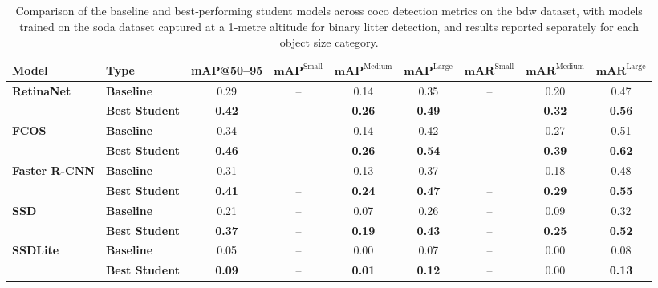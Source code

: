 \begin{table}[htbp]
\centering
\renewcommand{\arraystretch}{1.5} %
\begin{adjustbox}{width=\textwidth}
\begin{tabular}{llccccccc}
\hline
\textbf{Model} & \textbf{Type} & \textbf{mAP@50--95} & \(\mathbf{mAP}^{\text{Small}}\) & \(\mathbf{mAP}^{\text{Medium}}\) & \(\mathbf{mAP}^{\text{Large}}\) & \(\mathbf{mAR}^{\text{Small}}\) & \(\mathbf{mAR}^{\text{Medium}}\) & \(\mathbf{mAR}^{\text{Large}}\) \\ \hline
\multirow{2}{*}{\textbf{RetinaNet}} 
 & \textbf{Baseline}      & 0.29 & --    & 0.14 & 0.35 & --    & 0.20 & 0.47 \\
 & \textbf{Best Student}  & \textbf{0.42} & --    & \textbf{0.26} & \textbf{0.49} & --    & \textbf{0.32} & \textbf{0.56} \\ \hline
\multirow{2}{*}{\textbf{FCOS}} 
 & \textbf{Baseline}      & 0.34 & --    & 0.14 & 0.42 & --    & 0.27 & 0.51 \\
 & \textbf{Best Student}  & \textbf{0.46} & --    & \textbf{0.26} & \textbf{0.54} & --    & \textbf{0.39} & \textbf{0.62} \\ \hline
\multirow{2}{*}{\textbf{Faster R-CNN}} 
 & \textbf{Baseline}      & 0.31 & --    & 0.13 & 0.37 & --    & 0.18 & 0.48 \\
 & \textbf{Best Student}  & \textbf{0.41} & --    & \textbf{0.24} & \textbf{0.47} & --    & \textbf{0.29} & \textbf{0.55} \\ \hline
\multirow{2}{*}{\textbf{SSD}} 
 & \textbf{Baseline}      & 0.21 & --    & 0.07 & 0.26 & --    & 0.09 & 0.32 \\
 & \textbf{Best Student}  & \textbf{0.37} & --    & \textbf{0.19} & \textbf{0.43} & --    & \textbf{0.25} & \textbf{0.52} \\ \hline
\multirow{2}{*}{\textbf{SSDLite}} 
 & \textbf{Baseline}      & 0.05 & --    & 0.00 & 0.07 & --    & 0.00 & 0.08 \\
 & \textbf{Best Student}  & \textbf{0.09} & --    & \textbf{0.01} & \textbf{0.12} & --    & 0.00 & \textbf{0.13} \\ \hline
\end{tabular}
\end{adjustbox}
\caption{Comparison of the baseline and best‐performing student models across \gls{coco} detection metrics on the \gls{bdw} dataset, with models trained on the \gls{soda} dataset captured at a 1‐metre altitude for binary litter detection, and results reported separately for each object size category.}
\label{tab:bdw_object_sizes_split}
\end{table}

